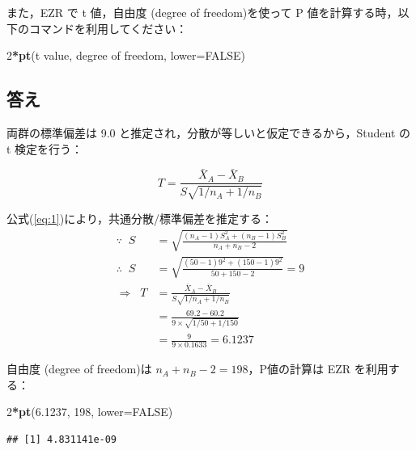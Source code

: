 \documentclass[11pt,]{problemset}
\newenvironment{Shaded}{\begin{snugshade}}{\end{snugshade}}
\newcommand{\DataTypeTok}[1]{\textcolor[rgb]{0.13,0.29,0.53}{#1}}
\newcommand{\DecValTok}[1]{\textcolor[rgb]{0.00,0.00,0.81}{#1}}
\newcommand{\FloatTok}[1]{\textcolor[rgb]{0.00,0.00,0.81}{#1}}
\newcommand{\KeywordTok}[1]{\textcolor[rgb]{0.13,0.29,0.53}{\textbf{#1}}}
\newcommand{\NormalTok}[1]{#1}
\newcommand{\OperatorTok}[1]{\textcolor[rgb]{0.81,0.36,0.00}{\textbf{#1}}}
\newcommand{\OtherTok}[1]{\textcolor[rgb]{0.56,0.35,0.01}{#1}}
\begin{document}
また，EZR で t 値，自由度 (degree of freedom)を使って P
値を計算する時，以下のコマンドを利用してください：

\begin{Shaded}
\begin{Highlighting}[]
\DecValTok{2}\OperatorTok{*}\KeywordTok{pt}\NormalTok{(t value, degree of freedom, }\DataTypeTok{lower=}\OtherTok{FALSE}\NormalTok{)}
\end{Highlighting}
\end{Shaded}

\newpage
\vfill

\hypertarget{section-1}{%
\subsection{答え}\label{section-1}}

両群の標準偏差は 9.0 と推定され，分散が等しいと仮定できるから，Student
の t 検定を行う：

\[
T = \frac{\bar{X}_A - \bar{X}_B}{S\sqrt{1/n_A + 1/n_B}}
\]

公式(\ref{eq:1})により，共通分散/標準偏差を推定する： \[
\begin{aligned}
\because\;\;  S & = \sqrt{\frac{(n_A - 1)S^2_A + (n_B - 1)S^2_B}{n_A + n_B -2}} \\
\therefore\;\; S & =  \sqrt{\frac{(50 - 1)9^2 + (150 - 1)9^2}{50 + 150 -2}} = 9 \\
\Rightarrow\;\; T & = \frac{\bar{X}_A - \bar{X}_B}{S\sqrt{1/n_A + 1/n_B}} \\ 
                  & = \frac{69.2 - 60.2}{9\times\sqrt{1/50 + 1/150}} \\ 
                  & = \frac{9}{9\times0.1633} = 6.1237
\end{aligned}
\]

自由度 (degree of freedom)は \(n_A + n_B -2 = 198\)，P値の計算は EZR
を利用する：

\begin{Shaded}
\begin{Highlighting}[]
\DecValTok{2}\OperatorTok{*}\KeywordTok{pt}\NormalTok{(}\FloatTok{6.1237}\NormalTok{, }\DecValTok{198}\NormalTok{, }\DataTypeTok{lower=}\OtherTok{FALSE}\NormalTok{)}
\end{Highlighting}
\end{Shaded}

\begin{verbatim}
## [1] 4.831141e-09
\end{verbatim}
\end{document}
